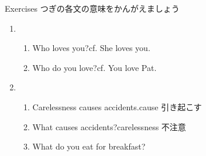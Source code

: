 \documentclass[aspectratio=169,xcolor={dvipsnames,table}]{beamer}
\begin{document}
\begin{frame}[plain]{Exercises}
\textdbend\textdbend つぎの各文の意味をかんがえましょう

\begin{enumerate}
 \item \begin{enumerate}
		  \item Who loves you?\hfill{}cf. She loves you.
		  \item Who do you love?\hfill{}cf. You love Pat. 
		 \end{enumerate}
 \item \begin{enumerate}
	\item Carelessness causes accidents.\hfill{\scriptsize cause  引き起こす}
	\item What causes accidents?\hfill{\scriptsize carelessness  不注意}
	\item What do you eat for breakfast?
       \end{enumerate}
\end{enumerate}

\end{frame}
\end{document}
